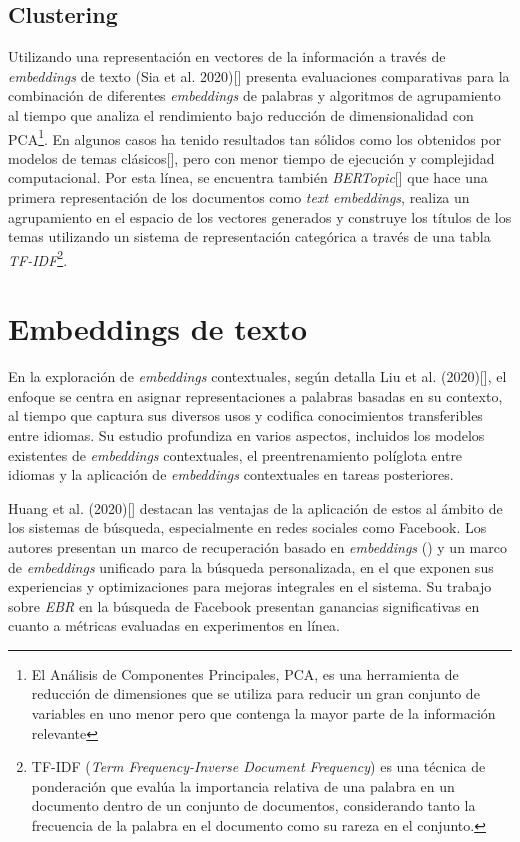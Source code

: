     \subsection{Clustering}
    Utilizando una representación en vectores de la información a través de \emph{embeddings} de texto (Sia et al. 2020)[\cite{sia2020tired}] presenta evaluaciones comparativas para la combinación de diferentes \emph{embeddings} de palabras y algoritmos de agrupamiento al tiempo que analiza el rendimiento bajo reducción de dimensionalidad con PCA\footnote{El Análisis de Componentes Principales, PCA, es una herramienta de reducción de dimensiones que se utiliza para reducir un gran conjunto de variables en uno menor pero que contenga la mayor parte de la información relevante}. En algunos casos ha tenido resultados tan sólidos como los obtenidos por modelos de temas clásicos[\cite{sia2020tiredResults}], pero con menor tiempo de ejecución y complejidad computacional. 
    Por esta línea, se encuentra también \emph{BERTopic}[\cite{bertopic}] que hace una primera representación de los documentos como \emph{text embeddings}, realiza un agrupamiento en el espacio de los vectores generados y construye los títulos de los temas utilizando un sistema de representación categórica a través de una tabla \emph{TF-IDF}\footnote{TF-IDF (\emph{Term Frequency-Inverse Document Frequency}) es una técnica de ponderación que evalúa la importancia relativa de una palabra en un documento dentro de un conjunto de documentos, considerando tanto la frecuencia de la palabra en el documento como su rareza en el conjunto.}.

\section{Embeddings de texto}
    En la exploración de \emph{embeddings} contextuales, según detalla Liu et al. (2020)[\cite{liu2020survey}], el enfoque se centra en asignar representaciones a palabras basadas en su contexto, al tiempo que captura sus diversos usos y codifica conocimientos transferibles entre idiomas. Su estudio profundiza en varios aspectos, incluidos los modelos existentes de \emph{embeddings} contextuales, el preentrenamiento políglota entre idiomas y la aplicación de \emph{embeddings} contextuales en tareas posteriores.

    Huang et al. (2020)[\cite{Huang_2020}] destacan las ventajas de la aplicación de estos al ámbito de los sistemas de búsqueda, especialmente en redes sociales como Facebook. Los autores presentan un marco de recuperación basado en \emph{embeddings} () y un marco de \emph{embeddings} unificado para la búsqueda personalizada, en el que exponen sus experiencias y optimizaciones para mejoras integrales en el sistema. Su trabajo sobre \emph{EBR} en la búsqueda de Facebook presentan ganancias significativas en cuanto a métricas evaluadas en experimentos en línea.

